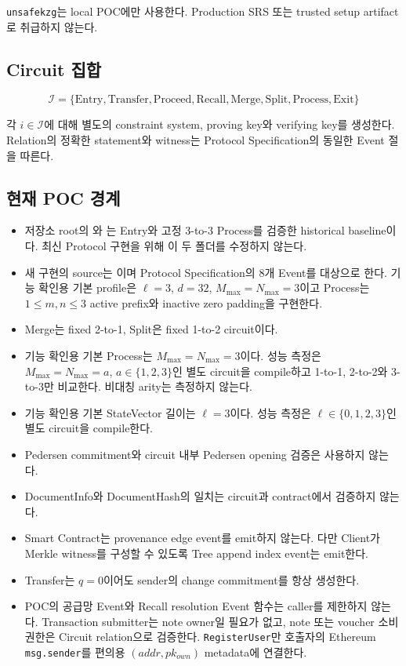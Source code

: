 \documentclass[11pt,a4paper]{extarticle}
\begin{document}
\texttt{unsafekzg}는 local POC에만 사용한다. Production SRS 또는 trusted setup
artifact로 취급하지 않는다.

\subsection{Circuit 집합}

\[
\mathcal{I}=\{
\mathrm{Entry},\mathrm{Transfer},\mathrm{Proceed},\mathrm{Recall},
\mathrm{Merge},\mathrm{Split},\mathrm{Process},\mathrm{Exit}
\}
\]

각 $i\in\mathcal{I}$에 대해 별도의 constraint system, proving key와 verifying key를
생성한다. Relation의 정확한 statement와 witness는 Protocol Specification의 동일한
Event 절을 따른다.

\subsection{현재 POC 경계}

\begin{itemize}
  \item 저장소 root의 와 는 Entry와 고정 3-to-3 Process를
        검증한 historical baseline이다. 최신 Protocol 구현을 위해 이 두 폴더를 수정하지 않는다.
  \item 새 구현의 source는 이며 Protocol Specification의 8개 Event를
        대상으로 한다. 기능 확인용 기본 profile은 $\ell=3$, $d=32$,
        $M_{\max}=N_{\max}=3$이고 Process는 $1\leq m,n\leq3$ active prefix와 inactive
        zero padding을 구현한다.
  \item Merge는 fixed 2-to-1, Split은 fixed 1-to-2 circuit이다.
  \item 기능 확인용 기본 Process는 $M_{\max}=N_{\max}=3$이다. 성능 측정은
        $M_{\max}=N_{\max}=a$, $a\in\{1,2,3\}$인 별도 circuit을 compile하고
        1-to-1, 2-to-2와 3-to-3만 비교한다. 비대칭 arity는 측정하지 않는다.
  \item 기능 확인용 기본 StateVector 길이는 $\ell=3$이다. 성능 측정은
        $\ell\in\{0,1,2,3\}$인 별도 circuit을 compile한다.
  \item Pedersen commitment와 circuit 내부 Pedersen opening 검증은 사용하지 않는다.
  \item DocumentInfo와 DocumentHash의 일치는 circuit과 contract에서 검증하지 않는다.
  \item Smart Contract는 provenance edge event를 emit하지 않는다. 다만 Client가
        Merkle witness를 구성할 수 있도록 Tree append index event는 emit한다.
  \item Transfer는 $q=0$이어도 sender의 change commitment를 항상 생성한다.
  \item POC의 공급망 Event와 Recall resolution Event 함수는 caller를 제한하지 않는다.
        Transaction submitter는 note owner일 필요가 없고, note 또는 voucher 소비 권한은
        Circuit relation으로 검증한다. \texttt{RegisterUser}만 호출자의 Ethereum
        \texttt{msg.sender}를 편의용 $(addr,pk_{own})$ metadata에 연결한다.
\end{itemize}
\end{document}
